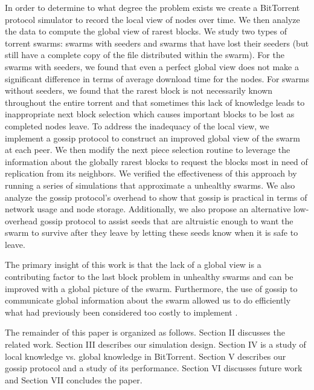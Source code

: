 In order to determine to what degree the problem exists we create a
BitTorrent protocol simulator to record the local view of nodes over
time. We then analyze the data to compute the global view of rarest
blocks. We study two types of torrent swarms: swarms with seeders and
swarms that have lost their seeders (but still have a complete copy of
the file distributed within the swarm). For the swarms with seeders,
we found that even a perfect global view does not make a significant
difference in terms of average download time for the nodes. For swarms
without seeders, we found that the rarest block is not necessarily
known throughout the entire torrent and that sometimes this lack of
knowledge leads to inappropriate next block selection which causes
important blocks to be lost as completed nodes leave. To address
the inadequacy of the local view, we implement a gossip protocol to
construct an improved global view of the swarm at each peer.  We then
modify the next piece selection routine to leverage the information
about the globally rarest blocks to request the blocks most in need of
replication from its neighbors. We verified the effectiveness of this
approach by running a series of simulations that approximate a unhealthy
swarms. We also analyze the gossip protocol's overhead to show that gossip
is practical in terms of network usage and node storage.  Additionally,
we also propose an alternative low-overhead gossip protocol to assist
seeds that are altruistic enough to want the swarm to survive after they
leave by letting these seeds know when it is safe to leave.

The primary insight of this work is that the lack of a global view is
a contributing factor to the last block problem in unhealthy swarms
and can be improved with a global picture of the swarm.  Furthermore,
the use of gossip to communicate global information about the swarm 
allowed us to do efficiently what had previously been considered too
costly to implement \cite{cohen:1}.

The remainder of this paper is organized as follows. Section II discusses
the related work. Section III describes our simulation design.  Section IV
is a study of local knowledge vs. global knowledge in BitTorrent.  Section
V describes our gossip protocol and a study of its performance. Section
VI discusses future work and Section VII concludes the paper.
